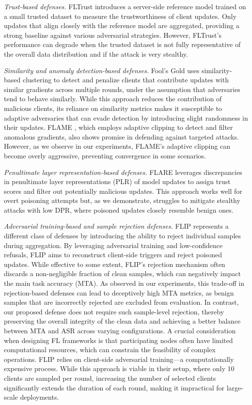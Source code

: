 \textit{Trust-based defenses.} FLTrust \citep{cao2021fltrust} introduces a server-side reference model trained on a small trusted dataset to measure the trustworthiness of client updates. Only updates that align closely with the reference model are aggregated, providing a strong baseline against various adversarial strategies. However, FLTrust’s performance can degrade when the trusted dataset is not fully representative of the overall data distribution and if the attack is very stealthy.  

\textit{Similarity and anomaly detection-based defenses.} Fool’s Gold \citep{fung2018mitigating} uses similarity-based clustering to detect and penalize clients that contribute updates with similar gradients across multiple rounds, under the assumption that adversaries tend to behave similarly. While this approach reduces the contribution of malicious clients, its reliance on similarity metrics makes it susceptible to adaptive adversaries that can evade detection by introducing slight randomness in their updates. FLAME \citep{nguyen2022flame}, which employs adaptive clipping to detect and filter anomalous gradients, also shows promise in defending against targeted attacks. However, as we observe in our experiments, FLAME’s adaptive clipping can become overly aggressive, preventing convergence in some scenarios.  

\textit{Penultimate layer representation-based defenses.} FLARE \citep{wang2022flare} leverages discrepancies in penultimate layer representations (PLR) of model updates to assign trust scores and filter out potentially malicious updates. This approach works well for overt poisoning attempts but, as we demonstrate, struggles to mitigate stealthy attacks with low DPR, where poisoned updates closely resemble benign ones.  

\textit{Adversarial training-based and sample rejection defenses.} FLIP \citep{zhang2023flip} represents a different class of defenses by introducing the ability to reject individual samples during aggregation. By leveraging adversarial training and low-confidence refusals, FLIP aims to reconstruct client-side triggers and reject poisoned updates. While effective to some extent, FLIP’s rejection mechanism often discards a non-negligible fraction of clean samples, which can negatively impact the main task accuracy (MTA). As observed in our experiments, this trade-off in rejection-based defenses can lead to deceptively high MTA metrics, as benign samples that are incorrectly rejected are excluded from evaluation. In contrast, our proposed defense does not require such sample-level rejection, thereby preserving the overall integrity of the clean data and achieving a better balance between MTA and ASR across varying configurations. A crucial consideration when designing FL frameworks is that participating nodes often have limited computational resources, which can constrain the feasibility of complex operations. \eg FLIP relies on client-side adversarial training—a computationally expensive process. While this approach is viable in their setup, where only 10 clients are sampled per round, increasing the number of selected clients significantly extends the duration of each round, making it impractical for large-scale deployments.

